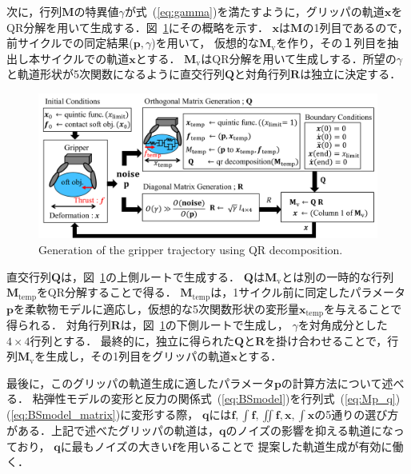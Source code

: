 \documentclass[a4paper]{jarticle}
\begin{document}
次に，行列$\mathbf{M}$の特異値$\gamma$が式~(\ref{eq:gamma})を満たすように，グリッパの軌道$\boldsymbol{x}$をQR分解を用いて生成する．図~{\ref{fig:QR_traj}}にその概略を示す．
$\boldsymbol{x}$は$\mathbf{M}$の1列目であるので，前サイクルでの同定結果($\mathbf{p},\gamma$)を用いて，
仮想的な$\mathbf{M}_{\mathrm{v}}$を作り，その１列目を抽出し本サイクルでの軌道$\boldsymbol{x}$とする．
$\mathbf{M_{\mathrm{v}}}$はQR分解を用いて生成しする．所望の$\gamma$と軌道形状が5次関数になるように直交行列$\mathbf{Q}$と対角行列$\mathbf{R}$は独立に決定する．
\begin{figure}[tb]
    \centering
    \includegraphics[width=1\textwidth]{QR_traj_eng.pdf}
    \captionsetup{width=0.9\linewidth} %
    \caption{Generation of the gripper trajectory using QR decomposition.}
    \label{fig:QR_traj}
\end{figure}
直交行列$\mathbf{Q}$は，図~\ref{fig:QR_traj}の上側ルートで生成する．
$\mathbf{Q}$は$\mathbf{M}_{\mathrm{v}}$とは別の一時的な行列$\mathbf{M}_{\mathrm{temp}}$をQR分解することで得る．
$\mathbf{M}_{\mathrm{temp}}$は，1サイクル前に同定したパラメータ$\mathbf{p}$を柔軟物モデルに適応し，仮想的な5次関数形状の変形量$\boldsymbol{x}_{\mathrm{temp}}$を与えることで得られる．
対角行列$\mathbf{R}$は，図~\ref{fig:QR_traj}の下側ルートで生成し，
$\gamma$を対角成分とした$4\times4$行列とする．
最終的に，独立に得られた$\mathbf{Q}$と$\mathbf{R}$を掛け合わせることで，行列$\mathbf{M_{\mathrm{v}}}$を生成し，その1列目をグリッパの軌道$\boldsymbol{x}$とする．

最後に，このグリッパの軌道生成に適したパラメータ$\mathbf{p}$の計算方法について述べる．
粘弾性モデルの変形と反力の関係式~(\ref{eq:BSmodel})を行列式~(\ref{eq:Mp_q})(\ref{eq:BSmodel_matrix})に変形する際，
$\mathbf{q}$には$\boldsymbol{f}, \int{\boldsymbol{f}} , \iint{\boldsymbol{f}}, \boldsymbol{x} , \int{\boldsymbol{x}}$の5通りの選び方がある．上記で述べたグリッパの軌道は，$\mathbf{q}$のノイズの影響を抑える軌道になっており，
$\mathbf{q}$に最もノイズの大きい$\boldsymbol{f}$を用いることで
提案した軌道生成が有効に働く．
\end{document}

